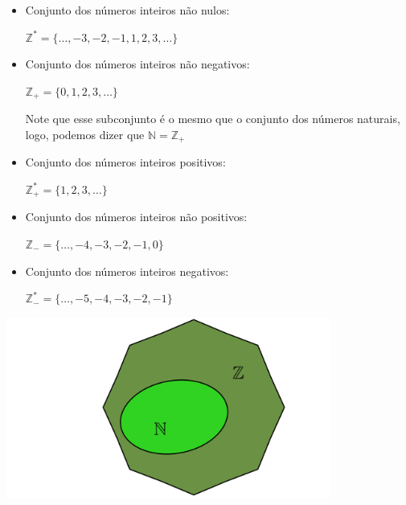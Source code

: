\documentclass[10pt]{article}
\begin{document}
\begin{multicols}{2}
    \begin{itemize}
        \item Conjunto dos números inteiros não nulos:

            \( \mathbb{Z}^* = \{\ldots, -3, -2, -1, 1, 2, 3, \ldots \} \)
        \item Conjunto dos números inteiros não negativos:
            
            \( \mathbb{Z}_+ = \{0, 1, 2, 3, \ldots \} \)
            
            \begin{obs}
            Note que esse subconjunto é o mesmo que o conjunto dos números naturais, logo, podemos dizer que \( \mathbb{N} = \mathbb{Z}_+\)
            \end{obs}
        \item Conjunto dos números inteiros positivos:
        
            \( \mathbb{Z}^*_+ = \{1, 2, 3, \ldots \} \)
        \item Conjunto dos números inteiros não positivos:
        
            \( \mathbb{Z}_- = \{\ldots, -4, -3, -2, -1, 0 \} \)
        \item Conjunto dos números inteiros negativos:
        
            \( \mathbb{Z}^*_- = \{\ldots, -5, -4, -3, -2, -1\} \)
        
    \end{itemize}
\columnbreak
\bigskip
\noindent
    \begin{minipage}{\linewidth}
        \centering 
        \includegraphics[width=0.8\textwidth]{imgs/conjuntosNumerico/conjuntosInteiros.pdf}
        \label{fig:conjuntosInteiros} 
    \end{minipage}%
\end{multicols} 
\end{document}
